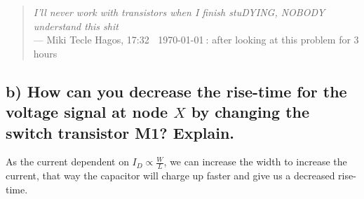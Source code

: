 \begin{quote}
    \textit{I'll never work with transistors when I finish stuDYING, NOBODY understand this shit}\\
    --- Miki Tecle Hagos, 17:32 $\:$ \today $\:$: after looking at this problem for 3 hours
\end{quote}

\subsection*{b) How can you decrease the rise-time for the voltage signal at node $X$ by changing the switch transistor M1? Explain.}

As the current dependent on $I_D \propto \frac{W}{L}$, we can increase the width to increase the current, that way the capacitor will charge up faster and give us a decreased rise-time.